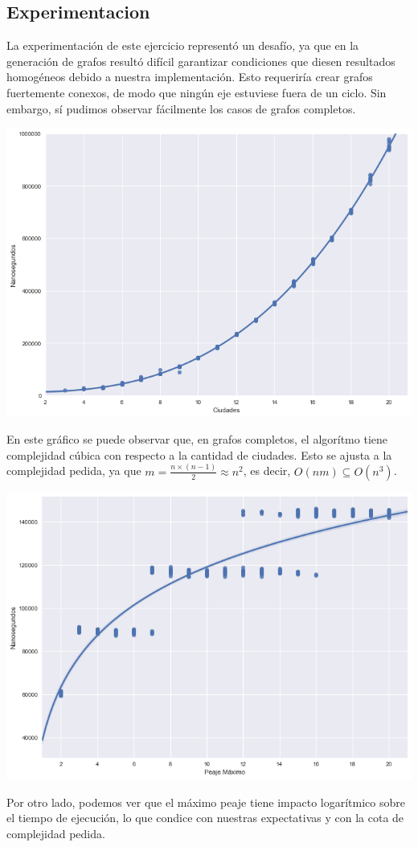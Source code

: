 \subsection{Experimentacion}

La experimentación de este ejercicio representó un desafío, ya que en la generación de grafos resultó difícil garantizar condiciones que diesen resultados homogéneos debido a nuestra implementación. Esto requeriría crear grafos fuertemente conexos, de modo que ningún eje estuviese fuera de un ciclo. Sin embargo, sí pudimos observar fácilmente los casos de grafos completos.

\begin{center}
	\includegraphics[scale=0.5]{imagenes/ej2-1.png}
\end{center}

En este gráfico se puede observar que, en grafos completos, el algorítmo tiene complejidad cúbica con respecto a la cantidad de ciudades. Esto se ajusta a la complejidad pedida, ya que $m = \frac{n \times (n-1)}{2} \approx n^2$, es decir, $O(n m) \subseteq O(n^3)$.

\begin{center}
	\includegraphics[scale=0.5]{imagenes/ej2-2.png}
\end{center}

Por otro lado, podemos ver que el máximo peaje tiene impacto logarítmico sobre el tiempo de ejecución, lo que condice con nuestras expectativas y con la cota de complejidad pedida.
